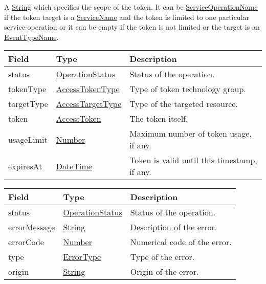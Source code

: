 \documentclass[a4paper]{arrowhead}
\newcommand{\pref}[1]{{\textcolor{ArrowheadGrey}{\hyperref[sec:model:primitives:#1]{#1}}}}
\begin{document}
A \pref{String} which specifies the scope of the token. It can be \pref{ServiceOperationName} if the token target is a \pref{ServiceName} and the token is limited to one particular service-operation or it can be empty if the token is not limited or the target is an \pref{EventTypeName}. 


\begin{table}[ht!]
\begin{tabularx}{\textwidth}{| p{4.25cm} | p{4.5cm} | X |} \hline
\rowcolor{gray!33} Field & Type & Description \\ \hline
status & \pref{OperationStatus} & Status of the operation. \\ \hline
tokenType & \pref{AccessTokenType} & Type of token technology group. \\ \hline
targetType & \pref{AccessTargetType} & Type of the targeted resource. \\ \hline
token & \pref{AccessToken} & The token itself. \\ \hline
usageLimit & \pref{Number} & Maximum number of token usage, if any. \\ \hline
expiresAt & \pref{DateTime} & Token is valid until this timestamp, if any. \\ \hline
\end{tabularx}
\end{table}


\begin{table}[ht!]
\begin{tabularx}{\textwidth}{| p{4.25cm} | p{3.5cm} | X |} \hline
\rowcolor{gray!33} Field & Type      & Description \\ \hline
status & \pref{OperationStatus} & Status of the operation. \\ \hline
errorMessage & \pref{String} & Description of the error. \\ \hline
errorCode &\pref{Number}  & Numerical code of the error. \\ \hline
type & \pref{ErrorType} & Type of the error. \\ \hline
origin & \pref{String} & Origin of the error. \\ \hline
\end{tabularx}
\end{table}

\end{document}
